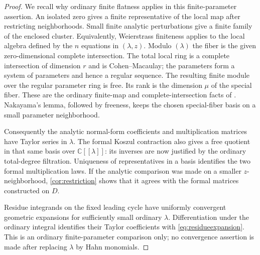 \documentclass[11pt,letterpaper]{article}
\theoremstyle{definition}
\theoremstyle{remark}
\newcommand{\C}{\mathbb C}
\begin{document}
\begin{proof}
We recall why ordinary finite flatness applies in this finite-parameter assertion. An isolated zero gives a finite representative of the local map after restricting neighborhoods. Small finite analytic perturbations give a finite family of the enclosed cluster. Equivalently, Weierstrass finiteness applies to the local algebra defined by the $n$ equations in $(\lambda,z)$. Modulo $(\lambda)$ the fiber is the given zero-dimensional complete intersection. The total local ring is a complete intersection of dimension $r$ and is Cohen--Macaulay; the parameters form a system of parameters and hence a regular sequence. The resulting finite module over the regular parameter ring is free. Its rank is the dimension $\mu$ of the special fiber. These are the ordinary finite-map and complete-intersection facts of \cite{GunningRossi}. Nakayama's lemma, followed by freeness, keeps the chosen special-fiber basis on a small parameter neighborhood.

Consequently the analytic normal-form coefficients and multiplication matrices have Taylor series in $\lambda$. The formal Koszul contraction also gives a free quotient in that same basis over $\C[[\lambda]]$: its inverses are now justified by the ordinary total-degree filtration. Uniqueness of representatives in a basis identifies the two formal multiplication laws. If the analytic comparison was made on a smaller $z$-neighborhood, \cref{cor:restriction} shows that it agrees with the formal matrices constructed on $D$.

Residue integrands on the fixed leading cycle have uniformly convergent geometric expansions for sufficiently small ordinary $\lambda$. Differentiation under the ordinary integral identifies their Taylor coefficients with \eqref{eq:residueexpansion}. This is an ordinary finite-parameter comparison only; no convergence assertion is made after replacing $\lambda$ by Hahn monomials.
\end{proof}
\end{document}
